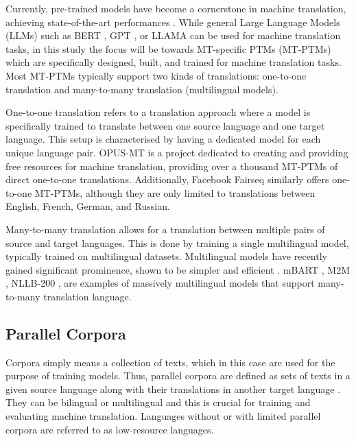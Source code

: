 \documentclass[a4paper, 11pt]{article}
\begin{document}
Currently, pre-trained models have become a cornerstone in machine translation, achieving state-of-the-art performances \cite{han-2021-ptms}. While general Large Language Models (LLMs) such as BERT \cite{devlin-2019-bert}, GPT \cite{openai-2024-gpt4}, or LLAMA \cite{touvron-2023-llama2} can be used for machine translation tasks, in this study the focus will be towards MT-specific PTMs (MT-PTMs) which are specifically designed, built, and trained for machine translation tasks. Most MT-PTMs typically support two kinds of translations: one-to-one translation and many-to-many translation (multilingual models).

One-to-one translation refers to a translation approach where a model is specifically trained to translate between one source language and one target language. This setup is characterised by having a dedicated model for each unique language pair. OPUS-MT \cite{tiedemann-2020-opus-mt} is a project dedicated to creating and providing free resources for machine translation, providing over a thousand MT-PTMs of direct one-to-one translations. Additionally, Facebook Fairseq \cite{ott-2019-fairseq} similarly offers one-to-one MT-PTMs, although they are only limited to translations between English, French, German, and Russian.

Many-to-many translation allows for a translation between multiple pairs of source and target languages. This is done by training a single multilingual model, typically trained on multilingual datasets. Multilingual models have recently gained significant prominence, shown to be simpler and efficient \cite{aharoni-2019-massively-multilingual}. mBART \cite{liu-2020-mbart}, M2M \cite{fan-2020-m2m100}, NLLB-200 \cite{nllb200-2020}, are examples of massively multilingual models that support many-to-many translation language.

\subsection{Parallel Corpora}

Corpora simply means a collection of texts, which in this case are used for the purpose of training models. Thus, parallel corpora are defined as sets of texts in a given source language along with their translations in another target language \cite{lefer-2020-parallel-corpora}. They can be bilingual or multilingual and this is crucial for training and evaluating machine translation. Languages without or with limited parallel corpora are referred to as low-resource languages.
\end{document}
